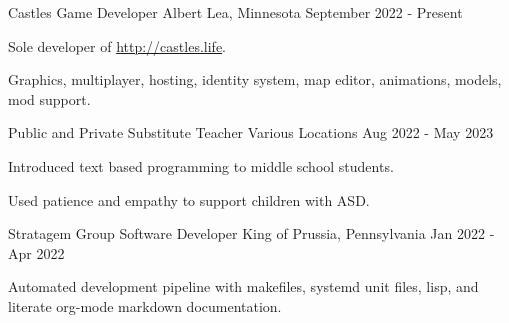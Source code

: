 

\begin{cventries}

  \cventry
    {Castles} %
    {Game Developer} %
    {Albert Lea, Minnesota} %
    {September 2022 - Present} %
    {
      \begin{cvitems} %
        \item {Sole developer of \url{http://castles.life}.}
        \item {Graphics, multiplayer, hosting, identity system, map editor, animations, models, mod support.}
      \end{cvitems}
    }



  \cventry
    {Public and Private} %
    {Substitute Teacher} %
    {Various Locations} %
    {Aug 2022 - May 2023} %
    {
      \begin{cvitems} %
        \item {Introduced text based programming to middle school students.}
        \item {Used patience and empathy to support children with ASD.}
      \end{cvitems}
    }

  \cventry
    {Stratagem Group} %
    {Software Developer} %
    {King of Prussia, Pennsylvania} %
    {Jan 2022 - Apr 2022} %
    {
      \begin{cvitems} %
        \item {Automated development pipeline with makefiles, systemd unit files, lisp, and literate org-mode markdown documentation.}
      \end{cvitems}
    }



\end{cventries}
